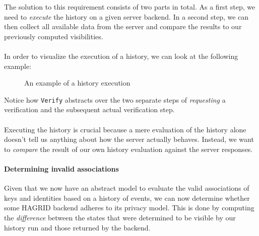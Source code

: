 The solution to this requirement consists of two parts in total. As a first step, we need to \emph{execute} the history on a given server backend. In a second step, we can then collect all available data from the server and compare the results to our previously computed visibilities. 
\\ \\
In order to visualize the execution of a history, we can look at the following example: 
\begin{figure}[H]
    \label{fig:history}
    \centering
    \caption{An example of a history execution}
\end{figure}

Notice how \texttt{Verify} abstracts over the two separate steps of \emph{requesting} a verification and the subsequent actual verification step. \\ \\
Executing the history is crucial because a mere evaluation of the history alone doesn't tell us anything about how the server actually behaves. Instead, we want to \emph{compare} the result of our own history evaluation against the server responses.



\paragraph{Determining invalid associations}
\label{sec:priv_condition}
Given that we now have an abstract model to evaluate the valid associations of keys and identities based on a history of events, we can now determine whether some HAGRID backend adheres to its privacy model. This is done by computing the \emph{difference} between the states that were determined to be visible by our history run and those returned by the backend.

